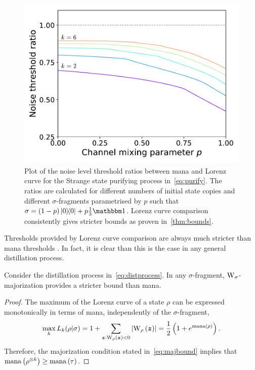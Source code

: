 \documentclass[pra,
aps,
twocolumn,
superscriptaddress,
groupedaddress,
nofootinbib,
reprint
]{revtex4-1}
\begin{document}
\begin{figure}
    \centering
    \includegraphics[scale=0.5]{figs/ratios.pdf}
    \caption{Plot of the noise level threshold ratios between mana and Lorenz curve for the Strange state purifying process in~\cref{eq:purify}.
    The ratios are calculated for different numbers of initial state copies and different $\sigma$-fragments parametrised by $p$ such that $\sigma = (1-p)\ketbra{0} + p \frac{1}{3}\id$.
    Lorenz curve comparison consistently gives stricter bounds as proven in~\cref{thm:bounds}.
    }
    \label{fig:distill}
\end{figure}

Thresholds provided by Lorenz curve comparison are always much stricter than mana thresholds .
In fact, it is clear than this is the case in any general distillation process.
\begin{theorem}\label{thm:bounds}
    Consider the distillation process in~\cref{eq:distprocess}.
    In any $\sigma$-fragment, $\W{\sigma}$-majorization provides a stricter bound than mana.
\end{theorem}
\begin{proof}
    The maximum of the Lorenz curve of a state $\rho$ can be expressed monotonically in terms of mana, independently of the $\sigma$-fragment,
    \begin{equation}
        \max_k{L_k(\rho | \sigma)} = 1 + \sum_{\bmz: \W[\bmz]{\rho}<0} \abs{\W[\bmz]{\rho}} = \frac{1}{2} \left( 1 + e^\mana{\rho} \right).
    \end{equation}
    Therefore, the majorization condition stated in~\cref{eq:majbound} implies that ${{\rm{mana}}\left(\rho^{\otimes k}\right)} \geq {{\rm{mana}}\left(\tau\right)}$.
\end{proof}
\end{document}
